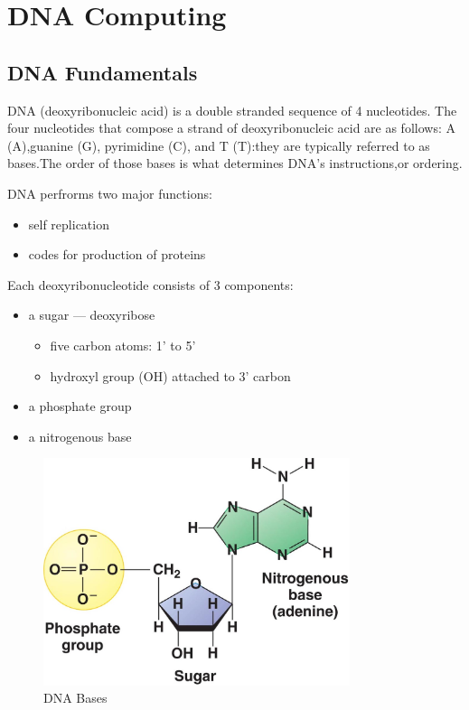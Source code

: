 \documentclass[a4paper]{article}
\begin{document}
\section{DNA Computing}
\label{sec:theory}

\subsection{DNA Fundamentals}
DNA (deoxyribonucleic acid) is a double stranded sequence of 4 nucleotides. The four nucleotides that compose a strand of deoxyribonucleic acid are as
follows: A (A),guanine (G), pyrimidine (C), and T (T):they are typically referred to as bases.The order of those bases is what determines DNA’s instructions,or ordering.

DNA perfrorms two major functions:
  \begin{itemize}
    \item self replication 
        \item codes for production of proteins
  \end{itemize}
Each deoxyribonucleotide consists of 3 components:
  \begin{itemize}

  \item {a sugar — deoxyribose
      \begin{itemize}
      \item five carbon atoms: 1' to 5' 
      \item hydroxyl group (OH) attached to 3' carbon
    \end{itemize}}
  \item a phosphate group
  \item a nitrogenous base
\end{itemize}


\begin{figure}[h!]
  \centering
  \includegraphics[width=0.8\textwidth]{dnaBases}
  \caption{DNA Bases}
\end{figure}
\end{document}

